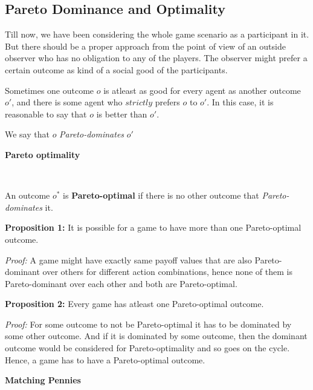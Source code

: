 \subsection{Pareto Dominance and Optimality}

Till now, we have been considering the whole game scenario as a participant in it. But there should be a proper approach from the point of view of an outside observer who has no obligation to any of the players. The observer might prefer a certain outcome as kind of a social good of the participants.\newline

Sometimes one outcome $o$ is atleast as good for every agent as another outcome $o'$, and there is some agent who $strictly$ prefers $o$ to $o'$. In this case, it is reasonable to say that $o$ is better than $o'$. 
\begin{center}We say that $o$ \textit{Pareto-dominates} $o'$\end{center}

\begin{large}\textbf{Pareto optimality}\end{large}\newline\

An outcome $o^*$ is \textbf{Pareto-optimal} if there is no other outcome that \textit{Pareto-dominates} it.
\begin{flushleft}
\textbf{Proposition 1:} It is possible for a game to have more than one Pareto-optimal outcome.\newline

\textit{Proof:} A game might have exactly same payoff values that are also Pareto-dominant over others for different action combinations, hence none of them is Pareto-dominant over each other and both are Pareto-optimal.\newline

\textbf{Proposition 2:} Every game has atleast one Pareto-optimal outcome.\newline

\textit{Proof:} For some outcome to not be Pareto-optimal it has to be dominated by some other outcome. And if it is dominated by some outcome, then the dominant outcome would be considered for Pareto-optimality and so goes on the cycle. Hence, a game has to have a Pareto-optimal outcome.
\end{flushleft}

\textbf{Matching Pennies}\\


